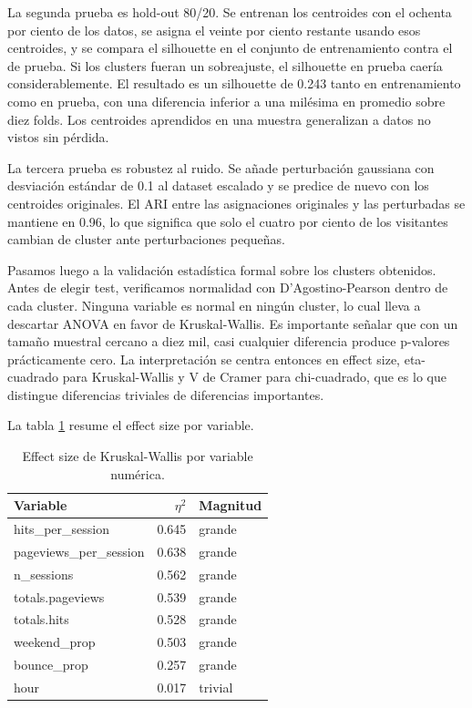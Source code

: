 \documentclass[11pt,a4paper]{article}
\begin{document}
La segunda prueba es hold-out 80/20. Se entrenan los centroides con el ochenta
por ciento de los datos, se asigna el veinte por ciento restante usando esos
centroides, y se compara el silhouette en el conjunto de entrenamiento contra el
de prueba. Si los clusters fueran un sobreajuste, el silhouette en prueba caería
considerablemente. El resultado es un silhouette de 0.243 tanto en entrenamiento
como en prueba, con una diferencia inferior a una milésima en promedio sobre
diez folds. Los centroides aprendidos en una muestra generalizan a datos no
vistos sin pérdida.

La tercera prueba es robustez al ruido. Se añade perturbación gaussiana con
desviación estándar de 0.1 al dataset escalado y se predice de nuevo con los
centroides originales. El ARI entre las asignaciones originales y las
perturbadas se mantiene en 0.96, lo que significa que solo el cuatro por ciento
de los visitantes cambian de cluster ante perturbaciones pequeñas.

Pasamos luego a la validación estadística formal sobre los clusters obtenidos.
Antes de elegir test, verificamos normalidad con D'Agostino-Pearson dentro de
cada cluster. Ninguna variable es normal en ningún cluster, lo cual lleva a
descartar ANOVA en favor de Kruskal-Wallis. Es importante señalar que con un
tamaño muestral cercano a diez mil, casi cualquier diferencia produce
p-valores prácticamente cero. La interpretación se centra entonces en effect
size, eta-cuadrado para Kruskal-Wallis y V de Cramer para chi-cuadrado, que es
lo que distingue diferencias triviales de diferencias importantes.

La tabla \ref{tab:effect_size} resume el effect size por variable.

\begin{table}[h]
\centering
\caption{Effect size de Kruskal-Wallis por variable numérica.}
\label{tab:effect_size}
\begin{tabular}{lrl}
\toprule
Variable & $\eta^2$ & Magnitud \\
\midrule
hits\_per\_session & 0.645 & grande \\
pageviews\_per\_session & 0.638 & grande \\
n\_sessions & 0.562 & grande \\
totals.pageviews & 0.539 & grande \\
totals.hits & 0.528 & grande \\
weekend\_prop & 0.503 & grande \\
bounce\_prop & 0.257 & grande \\
hour & 0.017 & trivial \\
\bottomrule
\end{tabular}
\end{table}
\end{document}
